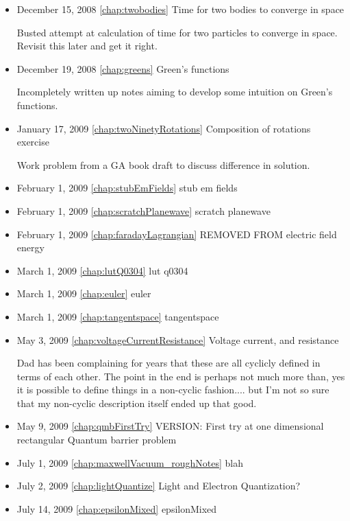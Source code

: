 \begin{itemize}
\item December 15, 2008 \ref{chap:twobodies} Time for two bodies to converge in space

Busted attempt at calculation of time for two particles to converge in space.  Revisit this later and get it right.\item December 19, 2008 \ref{chap:greens} Green's functions

Incompletely written up notes aiming to develop some intuition on Green's functions.\item January 17, 2009 \ref{chap:twoNinetyRotations} Composition of rotations exercise

Work problem from a GA book draft to discuss difference in solution. \item February 1, 2009 \ref{chap:stubEmFields} stub em fields

\item February 1, 2009 \ref{chap:scratchPlanewave} scratch planewave

\item February 1, 2009 \ref{chap:faradayLagrangian} REMOVED FROM electric field energy

\item March 1, 2009 \ref{chap:lutQ0304} lut q0304

\item March 1, 2009 \ref{chap:euler} euler

\item March 1, 2009 \ref{chap:tangentspace} tangentspace

\item May 3, 2009 \ref{chap:voltageCurrentResistance} Voltage current, and resistance

Dad has been complaining for years that these are all cyclicly defined in terms of each other.  The point in the end is perhaps not much more than, yes it is possible to define things in a non-cyclic fashion.... but I'm not so sure that my non-cyclic description itself ended up that good. \item May 9, 2009 \ref{chap:qmbFirstTry} VERSION: First try at one dimensional rectangular Quantum barrier problem

\item July 1, 2009 \ref{chap:maxwellVacuum_roughNotes} blah

\item July 2, 2009 \ref{chap:lightQuantize} Light and Electron Quantization?

\item July 14, 2009 \ref{chap:epsilonMixed} epsilonMixed


\end{itemize}
